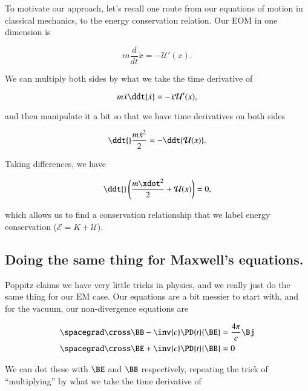 To motivate our approach, let's recall one route from our equations of motion in classical mechanics, to the energy conservation relation.  Our EOM in one dimension is

\begin{equation}\label{eqn:relativisticElectrodynamicsL16:450}
m \frac{d}{dt} \dot{x} = - \mathcal{U}'(x).
\end{equation}

We can multiply both sides by what we take the time derivative of

\begin{equation}\label{eqn:relativisticElectrodynamicsL16:470}
m \dot{x} \ddt{\dot{x}} = - \dot{x} \mathcal{U}'(x),
\end{equation}

and then manipulate it a bit so that we have time derivatives on both sides

\begin{equation}\label{eqn:relativisticElectrodynamicsL16:490}
\ddt{} \frac{m \dot{x}^2}{2} = - \ddt{ \mathcal{U}(x) }.
\end{equation}

Taking differences, we have

\begin{equation}\label{eqn:relativisticElectrodynamicsL16:510}
\ddt{} \left( \frac{m \xdot^2}{2} + \mathcal{U}(x) \right) = 0,
\end{equation}

which allows us to find a conservation relationship that we label energy conservation ($\mathcal{E} = K + \mathcal{U}$).

\subsection{Doing the same thing for Maxwell's equations.}

Poppitz claims we have very little tricks in physics, and we really just do the same thing for our EM case.  Our equations are a bit messier to start with, and for the vacuum, our non-divergence equations are

\begin{align}\label{eqn:relativisticElectrodynamicsL16:530}
\spacegrad \cross \BB -\inv{c} \PD{t}{\BE} &= \frac{4 \pi}{c} \Bj \\
\spacegrad \cross \BE +\inv{c} \PD{t}{\BB} &= 0
\end{align}

We can dot these with $\BE$ and $\BB$ respectively, repeating the trick of ``multiplying'' by what we take the time derivative of

